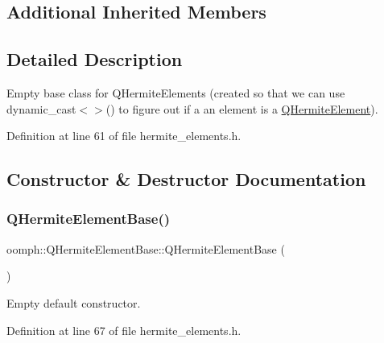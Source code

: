 \subsection*{Additional Inherited Members}


\subsection{Detailed Description}
Empty base class for Q\+Hermite\+Elements (created so that we can use dynamic\+\_\+cast$<$$>$() to figure out if a an element is a \hyperlink{classoomph_1_1QHermiteElement}{Q\+Hermite\+Element}). 

Definition at line 61 of file hermite\+\_\+elements.\+h.



\subsection{Constructor \& Destructor Documentation}
\mbox{\label{classoomph_1_1QHermiteElementBase_a2812a3e9c4a74144f5e81424fc2c2efa}} 
\subsubsection{\texorpdfstring{Q\+Hermite\+Element\+Base()}{QHermiteElementBase()}\hspace{0.1cm}{\footnotesize\ttfamily [1/2]}}
{\footnotesize\ttfamily oomph\+::\+Q\+Hermite\+Element\+Base\+::\+Q\+Hermite\+Element\+Base (\begin{DoxyParamCaption}{ }\end{DoxyParamCaption})\hspace{0.3cm}{\ttfamily [inline]}}



Empty default constructor. 



Definition at line 67 of file hermite\+\_\+elements.\+h.

\mbox{\label{classoomph_1_1QHermiteElementBase_a8cd59a73c2cdada6c096a9b5a9a209c5}} 

